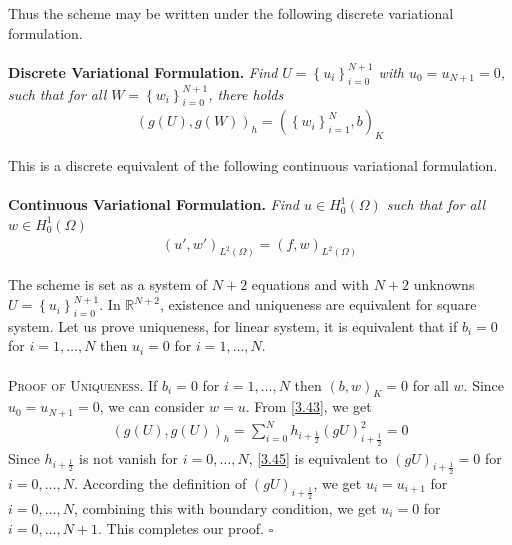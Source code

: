 \documentclass[a4paper]{article}
\numberwithin{equation}{section}
\begin{document}
Thus the scheme may be written under the following discrete variational formulation.\\
\\
\textbf{Discrete Variational Formulation.} \textit{Find $U=\left\{ {{u_i}} \right\}_{i = 0}^{N + 1}$ with $u_0=u_{N+1}=0$, such that for all $W=\left\{ {{w_i}} \right\}_{i = 0}^{N + 1}$, there holds}
\begin{align}
\label{3.43}
{\left( {g\left( U \right),g\left( W \right)} \right)_h} = {\left( {\left\{ {{w_i}} \right\}_{i = 1}^N,b} \right)_K}
\end{align}

This is a discrete equivalent of the following continuous variational formulation.\\
\\
\textbf{Continuous Variational Formulation.} \textit{Find $u \in H_0^1\left( \Omega  \right)$ such that for all $w \in H_0^1\left( \Omega  \right)$}
\begin{align}
{\left( {u',w'} \right)_{{L^2}\left( \Omega  \right)}} = {\left( {f,w} \right)_{{L^2}\left( \Omega  \right)}}
\end{align}

The scheme is set as a system of $N+2$ equations and with $N+2$ unknowns $U=\left\{ {{u_i}} \right\}_{i = 0}^{N + 1}$. In $\mathbb{R}^{N+2}$, existence and uniqueness are equivalent for square system. Let us prove uniqueness, for linear system, it is equivalent that if $b_i=0$ for $i=1,\ldots,N$ then $u_i=0$ for $i=1,\ldots,N$.\\
\\
\textsc{Proof of Uniqueness.} If $b_i=0$ for $i=1,\ldots,N$ then ${\left( {b,w} \right)_K} = 0$ for all $w$. Since $u_0=u_{N+1}=0$, we can consider $w=u$. From \eqref{3.43}, we get
\begin{align}
\label{3.45}
{\left( {g\left( U \right),g\left( U \right)} \right)_h} = \sum\limits_{i = 0}^N {{h_{i + \frac{1}{2}}}\left( {gU} \right)_{i + \frac{1}{2}}^2}  = 0
\end{align}
Since ${{h_{i + \frac{1}{2}}}}$ is not vanish for $i=0,\ldots,N$, \eqref{3.45} is equivalent to ${\left( {gU} \right)_{i + \frac{1}{2}}} = 0$ for $i=0,\ldots,N$. According the definition of ${\left( {gU} \right)_{i + \frac{1}{2}}}$, we get $u_i=u_{i+1}$ for $i=0,\ldots,N$, combining this with boundary condition, we get $u_i=0$ for $i=0,\ldots,N+1$. This completes our proof. \hfill $\square$
\end{document}

